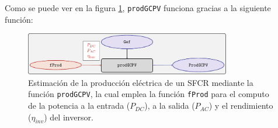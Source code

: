 Como se puede ver en la figura \ref{fig:prodgcpv}, \texttt{prodGCPV} funciona gracias a la siguiente función:
\begin{figure}[!htb]
\centering
\includegraphics[keepaspectratio,width=0.8\textwidth,height=\textheight]{figuras/prodgcpv.pdf}
\caption{Estimación de la producción eléctrica de un SFCR mediante la función \texttt{prodGCPV}, la cual emplea la función \texttt{fProd} para el computo de la potencia a la entrada (\(P_{DC}\)), a la salida (\(P_{AC}\)) y el rendimiento (\(\eta_{inv}\)) del inversor. \label{fig:prodgcpv}}
\end{figure}
